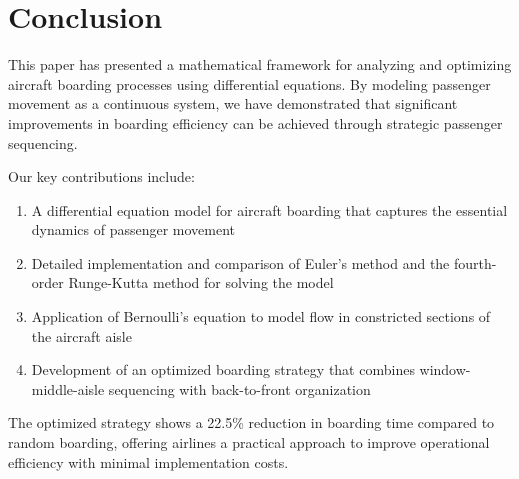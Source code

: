 \documentclass[a4paper,12pt]{article}
\begin{document}
\section{Conclusion}

This paper has presented a mathematical framework for analyzing and optimizing aircraft boarding processes using differential equations. By modeling passenger movement as a continuous system, we have demonstrated that significant improvements in boarding efficiency can be achieved through strategic passenger sequencing.

Our key contributions include:
\begin{enumerate}
    \item A differential equation model for aircraft boarding that captures the essential dynamics of passenger movement
    \item Detailed implementation and comparison of Euler's method and the fourth-order Runge-Kutta method for solving the model
    \item Application of Bernoulli's equation to model flow in constricted sections of the aircraft aisle
    \item Development of an optimized boarding strategy that combines window-middle-aisle sequencing with back-to-front organization
\end{enumerate}

The optimized strategy shows a 22.5\% reduction in boarding time compared to random boarding, offering airlines a practical approach to improve operational efficiency with minimal implementation costs.
\end{document}
